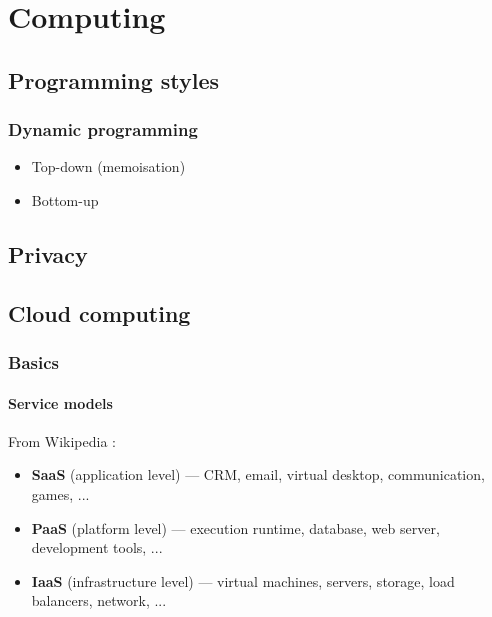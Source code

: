 \chapter{Computing}

\section{Programming styles}
\subsection{Dynamic programming}
\begin{itemize}
	\item Top-down (memoisation)
	\item Bottom-up
\end{itemize}

\section{Privacy}

\section{Cloud computing}

\subsection{Basics}

\subsubsection{Service models}

From Wikipedia \cite{wikipedia_cloud_computing}:
\begin{itemize}
	\item \textbf{SaaS} (application level) --- CRM, email, virtual desktop, communication, games, ...
	\item \textbf{PaaS} (platform level) --- execution runtime, database, web server, development tools, ...
	\item \textbf{IaaS} (infrastructure level) --- virtual machines, servers, storage, load balancers, network, ...
\end{itemize}